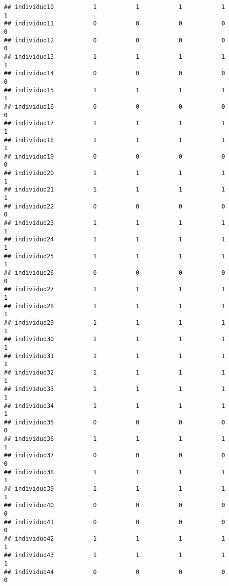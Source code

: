 \documentclass[
]{article}
\begin{document}
\begin{verbatim}
## individuo10           1           1           1           1           1
## individuo11           0           0           0           0           0
## individuo12           0           0           0           0           0
## individuo13           1           1           1           1           1
## individuo14           0           0           0           0           0
## individuo15           1           1           1           1           1
## individuo16           0           0           0           0           0
## individuo17           1           1           1           1           1
## individuo18           1           1           1           1           1
## individuo19           0           0           0           0           0
## individuo20           1           1           1           1           1
## individuo21           1           1           1           1           1
## individuo22           0           0           0           0           0
## individuo23           1           1           1           1           1
## individuo24           1           1           1           1           1
## individuo25           1           1           1           1           1
## individuo26           0           0           0           0           0
## individuo27           1           1           1           1           1
## individuo28           1           1           1           1           1
## individuo29           1           1           1           1           1
## individuo30           1           1           1           1           1
## individuo31           1           1           1           1           1
## individuo32           1           1           1           1           1
## individuo33           1           1           1           1           1
## individuo34           1           1           1           1           1
## individuo35           0           0           0           0           0
## individuo36           1           1           1           1           1
## individuo37           0           0           0           0           0
## individuo38           1           1           1           1           1
## individuo39           1           1           1           1           1
## individuo40           0           0           0           0           0
## individuo41           0           0           0           0           0
## individuo42           1           1           1           1           1
## individuo43           1           1           1           1           1
## individuo44           0           0           0           0           0

\end{verbatim}
\end{document}
